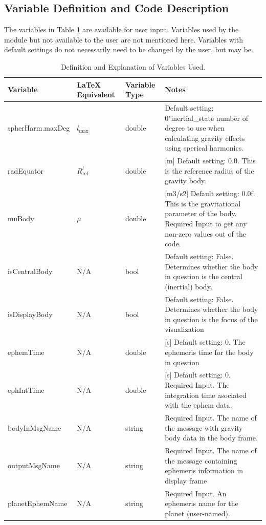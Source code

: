 \subsection{Variable Definition and Code Description}
The variables in Table \ref{tabular:vars} are available for user input. Variables used by the module but not available to the user are not mentioned here. Variables with default settings do not necessarily need to be changed by the user, but may be.
\begin{table}[H]
	\caption{Definition and Explanation of Variables Used.}
	\label{tab:errortol}
	\centering \fontsize{10}{10}\selectfont
	\begin{tabular}{ | m{3cm}| m{3cm} | m{3cm} | m{6cm} |} %
		\hline
		\textbf{Variable}   							& \textbf{LaTeX Equivalent} 	&		\textbf{Variable Type} & \textbf{Notes}			  \\ \hline
		spherHarm.maxDeg					&$l_{\text{max}}$		 	  & double & Default setting: 0"inertial\_state number of degree to use when calculating gravity effects using sperical harmonics.\\ \hline
		radEquator			   & $R_{\mathrm{ref}}^{l}$			& double & [m] Default setting: 0.0. 	This is the reference radius of the gravity body.\\ \hline
		muBody					& $\mu$ 		& double & [m3/s2] Default setting: 0.0f. This is the gravitational parameter of the body. Required Input to get any non-zero values out of the code.\\ \hline
		isCentralBody & N/A & bool & Default setting: False. Determines whether the body in question is the central (inertial) body.\\ \hline
		isDisplayBody & N/A & bool & Default setting: False. Determines whether the body in question is the focus of the visualization\\ \hline
		ephemTime & N/A & double & [s] Default setting: 0. The ephemeris time for the body in question \\ \hline
		ephIntTime & N/A & double & [s] Default setting: 0. Required Input. The integration time asociated with the ephem data. \\ \hline
		bodyInMsgName & N/A & string & Required Input. The name of the message with gravity body data in the body frame. \\ \hline
		outputMsgName & N/A & string & Required Input. The name of the message containing ephemeris information in display frame \\ \hline
		planetEphemName & N/A & string & Required Input. An ephemeris name for the planet (user-named). \\ \hline
	\end{tabular}
	\label{tabular:vars}
\end{table}
